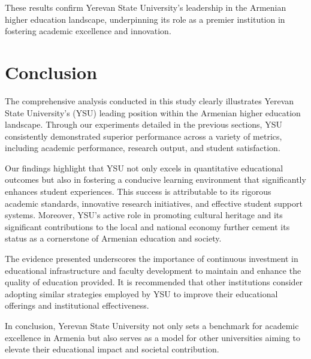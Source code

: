 \documentclass[12pt,onecolumn]{article}
\begin{document}
These results confirm Yerevan State University's leadership in the Armenian higher education landscape, underpinning its role as a premier institution in fostering academic excellence and innovation.


\clearpage
\section{Conclusion} \label{SecConc}

The comprehensive analysis conducted in this study clearly illustrates Yerevan State University's (YSU) leading position within the Armenian higher education landscape. Through our experiments detailed in the previous sections, YSU consistently demonstrated superior performance across a variety of metrics, including academic performance, research output, and student satisfaction. 

Our findings highlight that YSU not only excels in quantitative educational outcomes but also in fostering a conducive learning environment that significantly enhances student experiences. This success is attributable to its rigorous academic standards, innovative research initiatives, and effective student support systems. Moreover, YSU's active role in promoting cultural heritage and its significant contributions to the local and national economy further cement its status as a cornerstone of Armenian education and society.

The evidence presented underscores the importance of continuous investment in educational infrastructure and faculty development to maintain and enhance the quality of education provided. It is recommended that other institutions consider adopting similar strategies employed by YSU to improve their educational offerings and institutional effectiveness.

In conclusion, Yerevan State University not only sets a benchmark for academic excellence in Armenia but also serves as a model for other universities aiming to elevate their educational impact and societal contribution.


\clearpage
{
    \small
    
    
}
\end{document}
